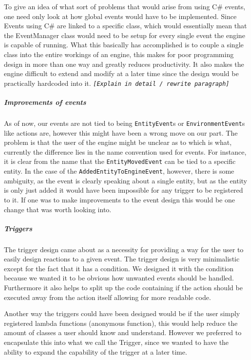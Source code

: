 To give an idea of what sort of problems that would arise from using
C\# events, one need only look at how global events would have to
be implemented. Since Events using C\# are linked to a specific class,
which would essentially mean that the EventManager class would need
to be setup for every single event the engine is capable of running.
What this basically has accomplished is to couple a single class into
the entire workings of an engine, this makes for poor programming
design in more than one way and greatly reduces productivity. It also
makes the engine difficult to extend and modify at a later time since
the design would be practically hardcoded into it. \texttt{\emph{{[}Explain
in detail / rewrite paragraph{]}}}


\subparagraph*{Improvements of events}

As of now, our events are not tied to being \texttt{EntityEvent}s
or \texttt{EnvironmentEvent}s like actions are, however this might
have been a wrong move on our part. The problem is that the user of
the engine might be unclear as to which is what, currently the difference
lies in the name convention used for events. For instance, it is clear
from the name that the \texttt{EntityMovedEvent} can be tied to a
specific entity. In the case of the \texttt{AddedEntityToEngineEvent},
however, there is some ambiguity, as the event is clearly speaking
about a single entity, but as the entity is only just added it would
have been impossible for any trigger to be registered to it. If one
was to make improvements to the event design this would be one change
that was worth looking into.


\subparagraph*{Triggers}

The trigger design came about as a necessity for providing a way for
the user to easily design reactions to a given event. The trigger
design is very minimalistic except for the fact that it has a condition.
We designed it with the condition because we wanted it to be obvious
how unwanted events should be handled. Furthermore it also helps to
split up the code containing if the action should be executed away
from the action itself allowing for more readable code. 

Another way the triggers could have been designed would be if the
user simply registered lambda functions (anonymous function), this
would help reduce the amount of classes a user should know and understand.
However we preferred to encapsulate this into what we call the Trigger,
since we wanted to have the ability to expand the capability of the
trigger at a later time.

